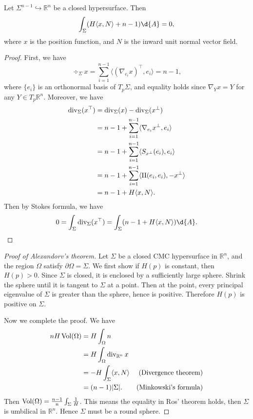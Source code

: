 \begin{thm}
    Let $\Sigma^{n-1}\hookrightarrow\mathbb{R}^n$ be a closed hypersurface. Then
    \[\int_\Sigma(H\langle x,N\rangle+n-1)\d{A}=0,\]
    where $x$ is the position function, and $N$ is the inward unit normal vector field.
\end{thm}
\begin{proof}
    First, we have
    \[\div\nolimits_\Sigma x=\sum_{i=1}^{n-1}\langle(\nabla_{e_i}x)^\top,e_i\rangle=n-1,\]
    where $\{e_i\}$ is an orthonormal basis of $T_p\Sigma$, and equality holds since $\nabla_{Y}x=Y$ for any $Y\in T_p\mathbb{R}^n$.
    Moreover, we have
    \begin{align*}
        \mathop{\mathrm{div}}\nolimits_\Sigma(x^\top)&=\mathop{\mathrm{div}}\nolimits_\Sigma(x)-\mathop{\mathrm{div}}\nolimits_\Sigma(x^\perp)\\
        &=n-1+\sum_{i=1}^{n-1}\langle\nabla_{e_i}x^\perp,e_i\rangle\\
        &=n-1+\sum_{i=1}^{n-1}\langle S_{x^\perp}(e_i),e_i\rangle\\
        &=n-1+\sum_{i=1}^{n-1}\langle\operatorname{II}(e_i,e_i),-x^\perp\rangle\\
        &=n-1+H\langle x,N\rangle.
    \end{align*}
    Then by Stokes formula, we have
    \[0=\int_\Sigma\div\nolimits_\Sigma(x^\top)=\int_\Sigma(n-1+H\langle x,N\rangle)\d{A}.\qedhere\]
\end{proof}

\begin{proof}[Proof of Alexandorv's theorem]
    Let $\Sigma$ be a closed CMC hypersurface in $\mathbb{R}^n$, and the region $\Omega$ satisfy $\partial\Omega=\Sigma$.
    We first show if $H(p)$ is constant, then $H(p)>0$.
    Since $\Sigma$ is closed, it is enclosed by a sufficiently large sphere.
    Shrink the sphere until it is tangent to $\Sigma$ at a point.
    Then at the point, every principal eigenvalue of $\Sigma$ is greater than the sphere, hence is positive.
    Therefore $H(p)$ is positive on $\Sigma$.

    Now we complete the proof.
    We have
    \begin{align*}
        nH\operatorname{Vol}(\Omega)&=H\int_\Omega n &\\
        &=H\int_\Omega\mathop{\mathrm{div}}\nolimits_{\mathbb{R}^n}x &\\
        &=-H\int_\Sigma\langle x,N\rangle & \text{(Divergence theorem)}\\
        &=(n-1)|\Sigma|. & \text{(Minkowski's formula)}
    \end{align*}
    Then $\operatorname{Vol}(\Omega)=\frac{n-1}{n}\int_\Sigma\frac{1}{H}$.
    This means the equality in Ros' theorem holds, then $\Sigma$ is umbilical in $\mathbb{R}^n$.
    Hence $\Sigma$ must be a round sphere.
\end{proof}


